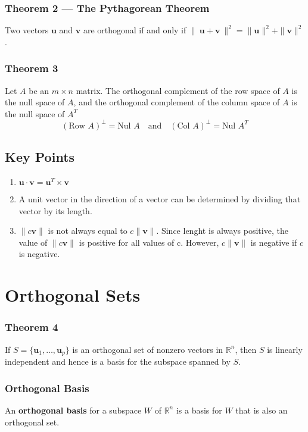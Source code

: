 \documentclass{article}
\begin{document}
\subsubsection*{Theorem 2 --- The Pythagorean Theorem}
Two vectors $\mathbf{u}$ and $\mathbf{v}$ are orthogonal if and only if
$\|\:\mathbf{u}+\mathbf{v}\:\|^2 = \|\mathbf{u}\|^2 + \|\mathbf{v}\|^2$.

\subsubsection*{Theorem 3}
Let $A$ be an $m\times n$ matrix. The orthogonal complement of the row space of $A$ is the null
space of $A$, and the orthogonal complement of the column space of $A$ is the null space of $A^T$
\[{(\text{Row }A)}^\perp = \text{Nul }A\quad\text{and}\quad{(\text{Col }A)}^\perp=\text{Nul }A^T\]

\subsection*{Key Points}
\begin{enumerate}
    \item $\mathbf{u}\cdot\mathbf{v}=\mathbf{u}^T\times \mathbf{v}$
    \item A unit vector in the direction of a vector can be determined by dividing that vector by
    its length.
    \item $\|c\mathbf{v}\|$ is not always equal to $c\|\mathbf{v}\|$. Since lenght is always
    positive, the value of $\|c\mathbf{v}\|$ is positive for all values of c. However,
    $c\|\mathbf{v}\|$ is negative if $c$ is negative.
\end{enumerate}

\section*{Orthogonal Sets}

\subsubsection*{Theorem 4}
If $S=\{\mathbf{u}_1, \ldots, \mathbf{u}_p\}$ is an orthogonal set of nonzero vectors in
$\mathbb{R}^n$, then $S$ is linearly independent and hence is a basis for the subspace spanned by
$S$.

\subsubsection*{Orthogonal Basis}
An \textbf{orthogonal basis} for a subspace $W$ of $\mathbb{R}^n$ is a basis for $W$ that is also
an orthogonal set.
\end{document}

